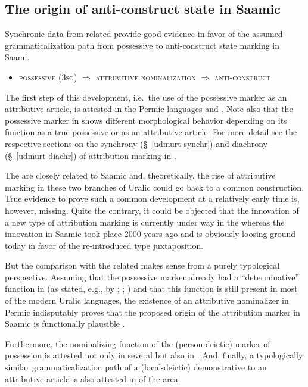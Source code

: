 {\subsection{The origin of anti-construct state in Saamic}
Synchronic data from related  provide good evidence in favor of the assumed grammaticalization path from possessive to anti-construct state marking in Saami.
\begin{itemize}
\item \textsc{possessive} (\textsc{3sg}) $\Rightarrow$ \textsc{attributive nominalization} $\Rightarrow$ \textsc{anti}-\textsc{construct}
\end{itemize}
The first step of this development, i.e.~the use of the possessive marker as an attributive article, is attested in the Permic languages  and . Note also that the possessive marker in  shows different morphological behavior depending on its function as a true possessive or as an attributive article. For more detail see the respective sections on the synchrony (\S~\ref{udmurt synchr}) and diachrony (\S~\ref{udmurt diachr}) of attribution marking in .

The  are closely related to Saamic and, theoretically, the rise of attributive marking in these two branches of Uralic could go back to a common  construction. True evidence to prove such a common development at a relatively early time is, however, missing. Quite the contrary, it could be objected that the innovation of a new type of attribution marking is currently under way in the  whereas the innovation in Saamic took place 2000 years ago and is obviously loosing ground today in favor of the re-introduced type juxtaposition.

But the comparison with the related  makes sense from a purely typological perspective. Assuming that the possessive marker already had a “determinative” function in  (as stated, e.g., by \citealt[32]{janhunen1981}; \citealt[66, 81]{decsy1990}; \citealt{kunnap2004}) and that this function is still present in most of the modern Uralic languages, the existence of an attributive nominalizer in Permic indisputably proves that the proposed origin of the attribution marker in Saamic is functionally plausible \citep{riesler2006b}.

Furthermore, the nominalizing function of the (person-deictic) marker of possession is attested not only in several  but also in . And, finally, a typologically similar grammaticalization path of a (local-deictic) demonstrative to an attributive article is also attested in  of the area.

}
